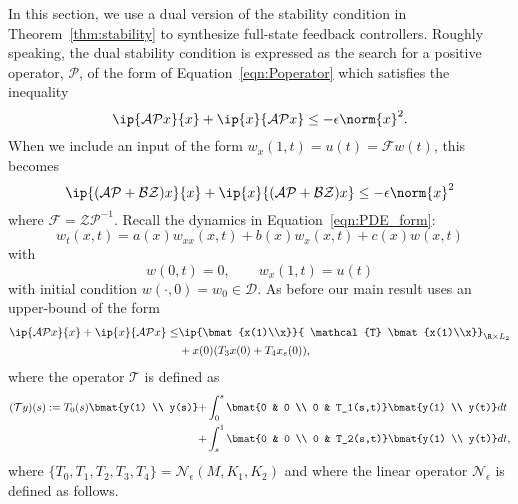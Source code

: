 \documentclass[9pt,journal,twocolumn]{IEEEtran}
\newcommand{\mcl}[1]{\mathcal{#1}}
\begin{document}
In this section, we use a dual version of the stability condition in Theorem~\ref{thm:stability} to synthesize full-state feedback controllers. Roughly speaking, the dual stability condition is expressed as the search for a positive operator, $\mathcal{P}$, of the form of Equation~\eqref{eqn:Poperator} which satisfies the inequality
\[
\ip{\mathcal{A}\mathcal{P}x}{x}+\ip{x}{\mathcal{A}\mathcal{P}x} \le -\epsilon \norm{x}^2.
\]
When we include an input of the form $w_x(1,t)=u(t)=\mathcal{F}w(t)$, this becomes
\[
\ip{(\mathcal{A}\mathcal{P}+\mathcal{B}\mathcal{Z}) x}{x}+\ip{x}{(\mathcal{A}\mathcal{P}+\mathcal{B}\mathcal{Z}) x} \le -\epsilon \norm{x}^2
\]
where $\mathcal{F} = \mathcal{Z}\mathcal{P}^{-1}$. Recall the dynamics in Equation~\eqref{eqn:PDE_form}:
\begin{equation}
\label{eqn:PDE_cont_form}
 w_t(x,t)=a(x)w_{xx}(x,t)+b(x)w_x(x,t)+c(x)w(x,t)
\end{equation} with
\begin{equation}
 \label{eqn:PDE_cont_form_BC}
 w(0,t)=0, \qquad w_x(1,t)=u(t)
\end{equation}
with initial condition $w(\cdot,0)=w_0\in \mcl{D}$.
As before our main result uses an upper-bound of the form
\begin{align}
  \ip{\mathcal{A}\mathcal{P}x}{x}+\ip{x}{\mathcal{A}\mathcal{P}x}  \le&  \ip{\bmat{x(1)\\x}}{ \mathcal{T} \bmat{x(1)\\x}}_{\R \times L_2}   \nonumber \\
  &+ x(0)(T_3 x(0)+T_4 x_s(0)),\label{eqn:dual_stab_LOI}
 \end{align}
where the operator $\mathcal{T}$ is defined as
\begin{align*}
(\mathcal{T}y)(s) := T_0(s)\bmat{y(1) \\ y(s)} +   &\int_0^s  \bmat{0 & 0 \\ 0 & T_1(s,t)} \bmat{y(1) \\ y(t)} dt  \\
+ &\int_s^1  \bmat{0 & 0 \\ 0 & T_2(s,t)} \bmat{y(1) \\ y(t)} dt,
\end{align*}
where $\{T_0,T_1,T_2,T_3,T_4\}=\mathcal{N}_\epsilon(M,K_1,K_2)$ and where the linear operator $\mathcal{N}_\epsilon$ is defined as follows.
\end{document}
